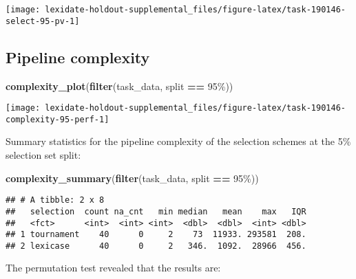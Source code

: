 \documentclass[
]{book}
\newenvironment{Shaded}{\begin{snugshade}}{\end{snugshade}}
\newcommand{\FunctionTok}[1]{\textcolor[rgb]{0.13,0.29,0.53}{\textbf{#1}}}
\newcommand{\NormalTok}[1]{#1}
\newcommand{\SpecialCharTok}[1]{\textcolor[rgb]{0.81,0.36,0.00}{\textbf{#1}}}
\newcommand{\StringTok}[1]{\textcolor[rgb]{0.31,0.60,0.02}{#1}}
\begin{document}
\texttt{[image: lexidate-holdout-supplemental\_files/figure-latex/task-190146-select-95-pv-1]}

\hypertarget{pipeline-complexity-18}{%
\subsection{Pipeline complexity}\label{pipeline-complexity-18}}

\begin{Shaded}
\begin{Highlighting}[]
\FunctionTok{complexity\_plot}\NormalTok{(}\FunctionTok{filter}\NormalTok{(task\_data, split }\SpecialCharTok{==} \StringTok{\textquotesingle{}95\%\textquotesingle{}}\NormalTok{))}
\end{Highlighting}
\end{Shaded}

\texttt{[image: lexidate-holdout-supplemental\_files/figure-latex/task-190146-complexity-95-perf-1]}

Summary statistics for the pipeline complexity of the selection schemes at the 5\% selection set split:

\begin{Shaded}
\begin{Highlighting}[]
\FunctionTok{complexity\_summary}\NormalTok{(}\FunctionTok{filter}\NormalTok{(task\_data, split }\SpecialCharTok{==} \StringTok{\textquotesingle{}95\%\textquotesingle{}}\NormalTok{))}
\end{Highlighting}
\end{Shaded}

\begin{verbatim}
## # A tibble: 2 x 8
##   selection  count na_cnt   min median   mean    max   IQR
##   <fct>      <int>  <int> <int>  <dbl>  <dbl>  <int> <dbl>
## 1 tournament    40      0     2    73  11933. 293581  208.
## 2 lexicase      40      0     2   346.  1092.  28966  456.
\end{verbatim}

The permutation test revealed that the results are:
\end{document}
